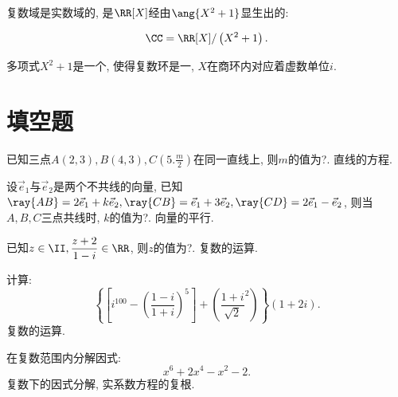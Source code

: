 \documentclass[8pt]{article}
\begin{document}
		 复数域是实数域的, 是\(\RR[X]\)经由\(\ang{X^2 + 1}\)显生出的: \cite{wiki-comp}

		\begin{displaymath}
			\CC = \RR[X] / \left(X^2 + 1\right).
		\end{displaymath}

		多项式\(X^2 + 1\)是一个, 使得复数环是一, \(X\)在商环内对应着虚数单位\(i\).

	\section{填空题}
		\begin{easonproblem}
			已知三点\(A(2, 3), B(4, 3), C\displaystyle\left(5. \frac{m}{2}\right)\)在同一直线上, 则\(m\)的值为?.
			\subproblem
			 直线的方程.
		\end{easonproblem}
		
		\begin{easonproblem}
			设\(\vec{e}_1\)与\(\vec{e}_2\)是两个不共线的向量, 已知\(\ray{AB} = 2 \vec{e}_1 + k \vec{e}_2, \ray{CB} = \vec{e}_1 + 3\vec{e}_2, \ray{CD} = 2\vec{e}_1 - \vec{e}_2\), 则当\(A, B, C\)三点共线时, \(k\)的值为?.
			\subproblem
			\answord{\(-8\).} 向量的平行.
		\end{easonproblem}

		\begin{easonproblem}
			已知\(z \in \II, \displaystyle \frac{z+2}{1-i} \in \RR\), 则\(z\)的值为?.
			\subproblem
			\answord{\(-2i\).} 复数的运算.
		\end{easonproblem}

		\begin{easonproblem}
			计算:
			\begin{displaymath}
				\left\{ \left[
						i^100 - \left(
							\frac{1-i}{1+i}
						\right)^5
					\right] + \left(
						\frac{1+i}{\sqrt{2}}^2
					\right)
				\right\}(1+2i).
			\end{displaymath}
			\subproblem
			\answord{\(-3+4i\).} 复数的运算.
		\end{easonproblem}
		
		\begin{easonproblem}
			在复数范围内分解因式:
			\begin{displaymath}
				x^6 + 2x^4 - x^2 - 2.
			\end{displaymath}
			\subproblem
			 复数下的因式分解, 实系数方程的复根.
		\end{easonproblem}
\end{document}
